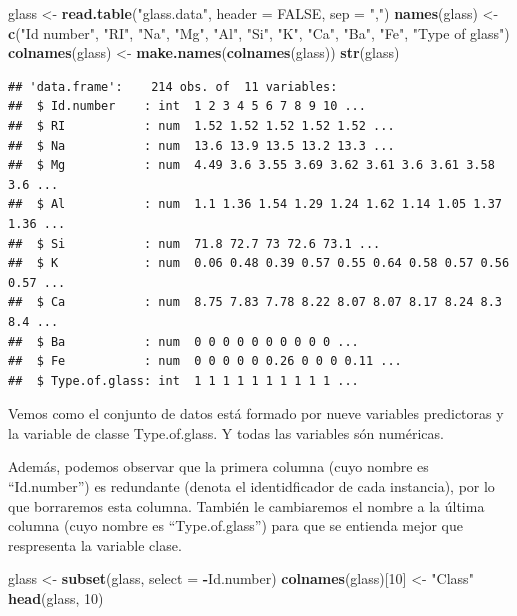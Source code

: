 \documentclass[]{article}
\newenvironment{Shaded}{\begin{snugshade}}{\end{snugshade}}
\newcommand{\DataTypeTok}[1]{\textcolor[rgb]{0.13,0.29,0.53}{#1}}
\newcommand{\DecValTok}[1]{\textcolor[rgb]{0.00,0.00,0.81}{#1}}
\newcommand{\KeywordTok}[1]{\textcolor[rgb]{0.13,0.29,0.53}{\textbf{#1}}}
\newcommand{\NormalTok}[1]{#1}
\newcommand{\OperatorTok}[1]{\textcolor[rgb]{0.81,0.36,0.00}{\textbf{#1}}}
\newcommand{\OtherTok}[1]{\textcolor[rgb]{0.56,0.35,0.01}{#1}}
\newcommand{\StringTok}[1]{\textcolor[rgb]{0.31,0.60,0.02}{#1}}
\begin{document}
\begin{Shaded}
\begin{Highlighting}[]
\NormalTok{glass <-}\StringTok{ }\KeywordTok{read.table}\NormalTok{(}\StringTok{"glass.data"}\NormalTok{, }\DataTypeTok{header =} \OtherTok{FALSE}\NormalTok{, }\DataTypeTok{sep =} \StringTok{","}\NormalTok{)}
\KeywordTok{names}\NormalTok{(glass) <-}\StringTok{ }\KeywordTok{c}\NormalTok{(}\StringTok{"Id number"}\NormalTok{, }\StringTok{"RI"}\NormalTok{, }\StringTok{"Na"}\NormalTok{, }\StringTok{"Mg"}\NormalTok{, }\StringTok{"Al"}\NormalTok{, }\StringTok{"Si"}\NormalTok{, }\StringTok{"K"}\NormalTok{, }\StringTok{"Ca"}\NormalTok{, }\StringTok{"Ba"}\NormalTok{, }\StringTok{"Fe"}\NormalTok{, }\StringTok{"Type of glass"}\NormalTok{)}
\KeywordTok{colnames}\NormalTok{(glass) <-}\StringTok{ }\KeywordTok{make.names}\NormalTok{(}\KeywordTok{colnames}\NormalTok{(glass))}
\KeywordTok{str}\NormalTok{(glass)}
\end{Highlighting}
\end{Shaded}

\begin{verbatim}
## 'data.frame':    214 obs. of  11 variables:
##  $ Id.number    : int  1 2 3 4 5 6 7 8 9 10 ...
##  $ RI           : num  1.52 1.52 1.52 1.52 1.52 ...
##  $ Na           : num  13.6 13.9 13.5 13.2 13.3 ...
##  $ Mg           : num  4.49 3.6 3.55 3.69 3.62 3.61 3.6 3.61 3.58 3.6 ...
##  $ Al           : num  1.1 1.36 1.54 1.29 1.24 1.62 1.14 1.05 1.37 1.36 ...
##  $ Si           : num  71.8 72.7 73 72.6 73.1 ...
##  $ K            : num  0.06 0.48 0.39 0.57 0.55 0.64 0.58 0.57 0.56 0.57 ...
##  $ Ca           : num  8.75 7.83 7.78 8.22 8.07 8.07 8.17 8.24 8.3 8.4 ...
##  $ Ba           : num  0 0 0 0 0 0 0 0 0 0 ...
##  $ Fe           : num  0 0 0 0 0 0.26 0 0 0 0.11 ...
##  $ Type.of.glass: int  1 1 1 1 1 1 1 1 1 1 ...
\end{verbatim}

Vemos como el conjunto de datos está formado por nueve variables
predictoras y la variable de classe Type.of.glass. Y todas las variables
són numéricas.

Además, podemos observar que la primera columna (cuyo nombre es
``Id.number'') es redundante (denota el identidficador de cada
instancia), por lo que borraremos esta columna. También le cambiaremos
el nombre a la última columna (cuyo nombre es ``Type.of.glass'') para
que se entienda mejor que respresenta la variable clase.

\begin{Shaded}
\begin{Highlighting}[]
\NormalTok{glass <-}\StringTok{ }\KeywordTok{subset}\NormalTok{(glass, }\DataTypeTok{select =} \OperatorTok{-}\NormalTok{Id.number)}
\KeywordTok{colnames}\NormalTok{(glass)[}\DecValTok{10}\NormalTok{] <-}\StringTok{ "Class"}
\KeywordTok{head}\NormalTok{(glass, }\DecValTok{10}\NormalTok{)}
\end{Highlighting}
\end{Shaded}
\end{document}
